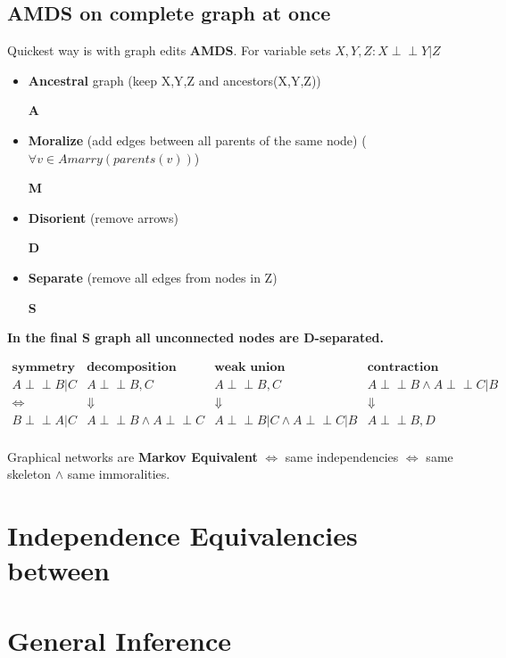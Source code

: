 \documentclass[a4paper,10pt]{article}
\newcommand{\negspace}{\!\!\!}
\newcommand{\idp}{\perp \negspace \perp}
\begin{document}
\subsection{AMDS on complete graph at once} 
Quickest way is with graph edits \textbf{AMDS}. For variable sets $X,Y,Z : X \idp Y | Z$
\begin{itemize}
 \item \textbf{Ancestral} graph (keep X,Y,Z and ancestors(X,Y,Z)) \begin{flushright}\textbf{A}\end{flushright}
 \item \textbf{Moralize} (add edges between all parents of the same node) ($\forall v \in A marry(parents(v))$) \begin{flushright}\textbf{M}\end{flushright}
 \item \textbf{Disorient} (remove arrows) \begin{flushright}\textbf{D}\end{flushright}
 \item \textbf{Separate} (remove all edges from nodes in Z) \begin{flushright}\textbf{S}\end{flushright}
\end{itemize}
\textbf{In the final S graph all unconnected nodes are D-separated.}

$$\begin{array}{c|c|c|c}
\textbf{symmetry} & \textbf{decomposition} & \textbf{weak union} & \textbf{contraction} \\
A \idp B | C &  A \idp B,C &  A \idp B,C & A \idp B \wedge A \idp C | B \\
\iff &  \Downarrow & \Downarrow & \Downarrow \\
B \idp A | C &  A \idp B \wedge A \idp C & A \idp B | C \wedge A \idp C | B &  A \idp B,D \\
\end{array}$$

Graphical networks are \textbf{Markov Equivalent} $\iff$ same independencies $\iff$ same skeleton $\wedge$ same immoralities.

\section{Independence Equivalencies between}

\section{General Inference}
\end{document}
